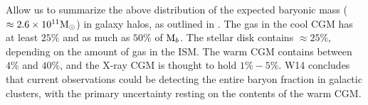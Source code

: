Allow us to summarize the above distribution of the expected baryonic
mass ($\approx 2.6\times 10^{11}\textrm{M}_\odot{}$) in galaxy halos, as outlined in
\citet{Werk2014}. The gas in the cool CGM has at least $25\%$ and as
much as $50\%$ of $\textrm{M}{}_{b}$. The stellar disk contains
$\approx25\%$, depending on the amount of gas in the ISM. The warm CGM
contains between $4\%$ and $40\%$, and the X-ray CGM is thought to
hold $1\% - 5\%$. W14 concludes that current observations could be
detecting the entire baryon fraction in galactic clusters, with the
primary uncertainty resting on the contents of the warm CGM. 
